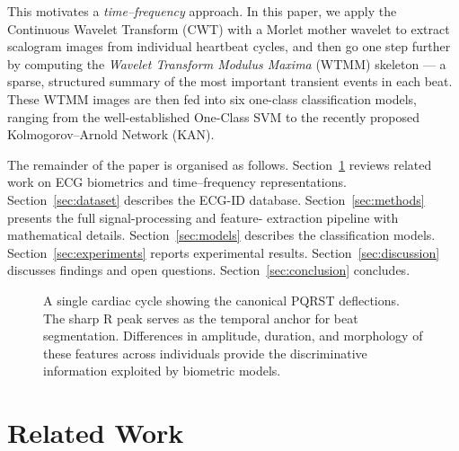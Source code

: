 \documentclass[12pt, a4paper]{article}
\begin{document}
This motivates a \textit{time--frequency} approach. In this paper, we apply
the Continuous Wavelet Transform (CWT) with a Morlet mother wavelet to extract
scalogram images from individual heartbeat cycles, and then go one step further
by computing the \textit{Wavelet Transform Modulus Maxima} (WTMM) skeleton ---
a sparse, structured summary of the most important transient events in each
beat. These WTMM images are then fed into six one-class classification
models, ranging from the well-established One-Class SVM to the recently
proposed Kolmogorov--Arnold Network (KAN).

The remainder of the paper is organised as follows.
Section~\ref{sec:related} reviews related work on ECG biometrics and
time--frequency representations.
Section~\ref{sec:dataset} describes the ECG-ID database.
Section~\ref{sec:methods} presents the full signal-processing and feature-
extraction pipeline with mathematical details.
Section~\ref{sec:models} describes the classification models.
Section~\ref{sec:experiments} reports experimental results.
Section~\ref{sec:discussion} discusses findings and open questions.
Section~\ref{sec:conclusion} concludes.

\begin{figure}[H]
  \centering
  \caption{A single cardiac cycle showing the canonical PQRST deflections.
    The sharp R peak serves as the temporal anchor for beat segmentation.
    Differences in amplitude, duration, and morphology of these features
    across individuals provide the discriminative information exploited by
    biometric models.}
  \label{fig:pqrst_placeholder}
\end{figure}

\section{Related Work}
\label{sec:related}
\end{document}
